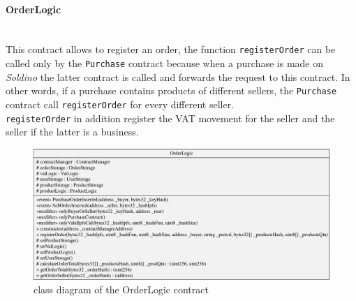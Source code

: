 \paragraph{OrderLogic}\mbox{}\\

\noindent This contract allows to register an order, the function \texttt{registerOrder} can be called only by the \texttt{Purchase} contract because when a purchase is made on \textit{Soldino} the latter contract is called and forwards the request to this contract. In other words, if a purchase contains products of different sellers, the \texttt{Purchase} contract call \texttt{registerOrder} for every different seller. \\
\texttt{registerOrder} in addition register the VAT movement for the seller and the seller if the latter is a business.
\begin{figure}[H]
	\centering
	\includegraphics[scale=0.25]{res/images/solidity/orderlogic.png}
	\caption{class diagram of the OrderLogic contract}
\end{figure}